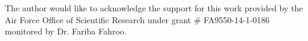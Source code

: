 
The author would like to acknowledge the support for this work provided by the Air Force Office of Scientific Research under grant \# FA9550-14-1-0186 monitored by Dr. Fariba Fahroo.